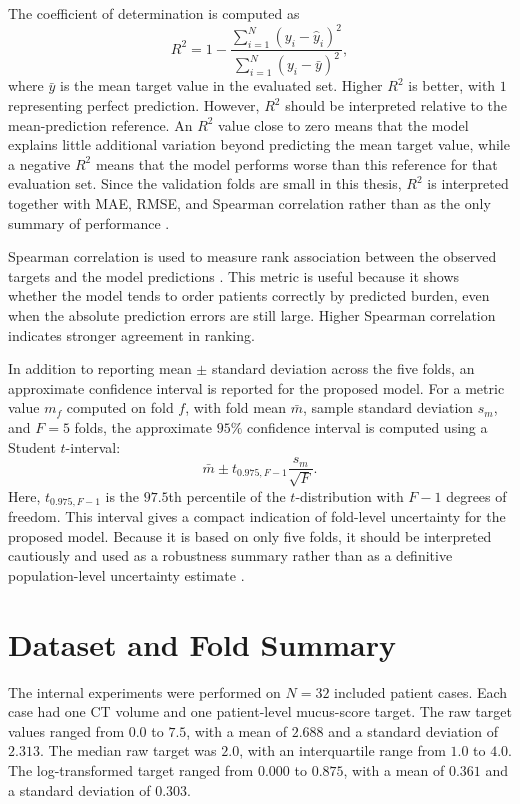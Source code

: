 The coefficient of determination is computed as
\[
R^2
=
1 -
\frac{
\sum_{i=1}^{N}(y_i-\hat{y}_i)^2
}{
\sum_{i=1}^{N}(y_i-\bar{y})^2
},
\]
where \(\bar{y}\) is the mean target value in the evaluated set. Higher \(R^2\) is better, with \(1\) representing perfect prediction. However, \(R^2\) should be interpreted relative to the mean-prediction reference. An \(R^2\) value close to zero means that the model explains little additional variation beyond predicting the mean target value, while a negative \(R^2\) means that the model performs worse than this reference for that evaluation set. Since the validation folds are small in this thesis, \(R^2\) is interpreted together with MAE, RMSE, and Spearman correlation rather than as the only summary of performance \cite{chicco2021coefficient}.

Spearman correlation is used to measure rank association between the observed targets and the model predictions \cite{spearman1904proof}. This metric is useful because it shows whether the model tends to order patients correctly by predicted burden, even when the absolute prediction errors are still large. Higher Spearman correlation indicates stronger agreement in ranking.

In addition to reporting mean \(\pm\) standard deviation across the five folds, an approximate confidence interval is reported for the proposed model. For a metric value \(m_f\) computed on fold \(f\), with fold mean \(\bar{m}\), sample standard deviation \(s_m\), and \(F=5\) folds, the approximate \(95\%\) confidence interval is computed using a Student \(t\)-interval:
\[
\bar{m}
\pm
t_{0.975,F-1}
\frac{s_m}{\sqrt{F}}.
\]
Here, \(t_{0.975,F-1}\) is the \(97.5\)th percentile of the \(t\)-distribution with \(F-1\) degrees of freedom. This interval gives a compact indication of fold-level uncertainty for the proposed model. Because it is based on only five folds, it should be interpreted cautiously and used as a robustness summary rather than as a definitive population-level uncertainty estimate \cite{openstax_t_interval}.


\section{Dataset and Fold Summary}
\label{sec:dataset_fold_summary}

The internal experiments were performed on \(N=32\) included patient cases. Each case had one CT volume and one patient-level mucus-score target. The raw target values ranged from \(0.0\) to \(7.5\), with a mean of \(2.688\) and a standard deviation of \(2.313\). The median raw target was \(2.0\), with an interquartile range from \(1.0\) to \(4.0\). The log-transformed target ranged from \(0.000\) to \(0.875\), with a mean of \(0.361\) and a standard deviation of \(0.303\).


